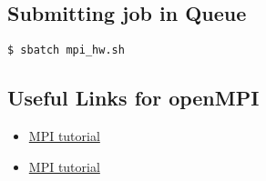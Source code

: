 \documentclass[11pt]{article}
\numberwithin{figure}{section}
\begin{document}
\subsection{Submitting job in Queue}

\begin{lstlisting}[frame=single]
$ sbatch mpi_hw.sh
\end{lstlisting}

\subsection{Useful Links for openMPI}

\begin{itemize}
    \item \href{https://www.google.com/url?sa=t&rct=j&q=&esrc=s&source=web&cd=1&cad=rja&uact=8&ved=0ahUKEwiC3oqOga_aAhXCvY8KHXJYCqwQFggnMAA&url=http%3A%2F%2Fmpitutorial.com%2Ftutorials%2F&usg=AOvVaw3gcXG-8XhYsVPu5egCZ2EP} {MPI tutorial}

\item \href{http://mpitutorial.com/tutorials/mpi-hello-world/}{MPI tutorial}
\end{itemize}
\end{document}
